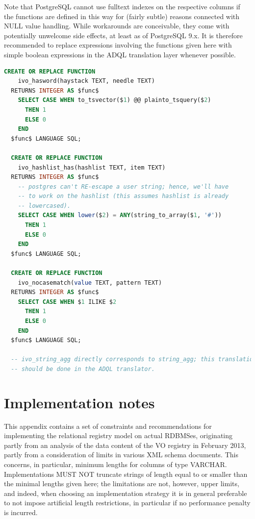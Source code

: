 \documentclass[11pt,a4paper]{ivoa}
\begin{document}
Note that PostgreSQL cannot use fulltext indexes on the respective
columns if the functions are defined in this way for (fairly subtle)
reasons connected with NULL value handling.  While workarounds are
conceivable, they come with potentially unwelcome side effects, at least
as of PostgreSQL 9.x.  It is therefore recommended to replace
expressions involving the functions given here with simple boolean
expressions in the ADQL translation layer whenever possible.


\begin{lstlisting}[language=SQL,flexiblecolumns=true,basicstyle=\footnotesize]
  CREATE OR REPLACE FUNCTION 
    ivo_hasword(haystack TEXT, needle TEXT)
  RETURNS INTEGER AS $func$
    SELECT CASE WHEN to_tsvector($1) @@ plainto_tsquery($2) 
      THEN 1 
      ELSE 0 
    END
  $func$ LANGUAGE SQL;

  CREATE OR REPLACE FUNCTION 
    ivo_hashlist_has(hashlist TEXT, item TEXT)
  RETURNS INTEGER AS $func$
    -- postgres can't RE-escape a user string; hence, we'll have
    -- to work on the hashlist (this assumes hashlist is already
    -- lowercased).
    SELECT CASE WHEN lower($2) = ANY(string_to_array($1, '#'))
      THEN 1 
      ELSE 0 
    END
  $func$ LANGUAGE SQL;

  CREATE OR REPLACE FUNCTION 
    ivo_nocasematch(value TEXT, pattern TEXT)
  RETURNS INTEGER AS $func$
    SELECT CASE WHEN $1 ILIKE $2
      THEN 1 
      ELSE 0 
    END
  $func$ LANGUAGE SQL;

  -- ivo_string_agg directly corresponds to string_agg; this translation
  -- should be done in the ADQL translator.
\end{lstlisting}



\section{Implementation notes}

\label{appBP}

This appendix contains a set of constraints and recommendations for
implementing the relational registry model on actual RDBMSes, originating
partly from an analysis of the data content of the VO registry in February
2013, partly from a consideration of limits in various XML schema documents.
This concerns, in particular, minimum lengths for columns of type
VARCHAR.  Implementations MUST NOT truncate strings of length equal
to or smaller than the minimal lengths given here; the limitations are
not, however, upper limits, and indeed, when choosing an implementation
strategy it is in general preferable to not impose artificial length
restrictions, in particular if no performance penalty is incurred.
\end{document}
